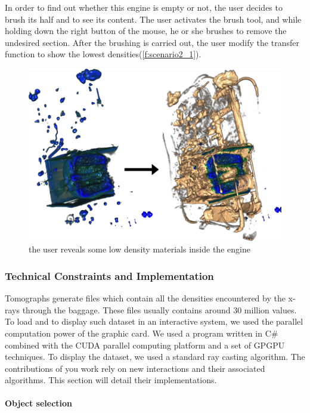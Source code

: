 In order to find out whether this engine is empty or not, the user decides to brush its half and to see its content. The user activates the brush tool, and while holding down the right button of the mouse, he or she brushes to remove the undesired section. After the brushing is carried out, the user modify the transfer function to show the lowest densities(\autoref{f:scenario2_1}).
\begin{figure}
\centering
\includegraphics[width=\textwidth]{Figures/scenario2_3.png}
\caption{ the user reveals some low density materials inside the engine }
\label{f:scenario2_1}
\end{figure}


\subsubsection{Technical Constraints and Implementation}

Tomographs generate files which contain all the densities encountered by the x-rays through the baggage. These files usually contains around 30 million values. To load and to display such dataset in an interactive system, we used the parallel computation power of the graphic card. We used a program written in C\# combined with the CUDA parallel computing platform and a set of GPGPU techniques. To display the dataset, we used a standard ray casting algorithm. The contributions of you work rely on new interactions and their associated algorithms. This section will detail their implementations.

\paragraph{Object selection}

